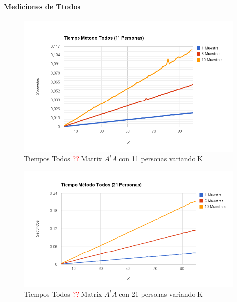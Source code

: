 \paragraph{Mediciones de Ttodos }

\begin{figure}[H]
\includegraphics[width=1\textwidth]{img/imaged.png}
     \caption{Tiempos Todos \textcolor{red}{??} Matrix $A^tA$ con 11 personas variando K}
     \label{fig:figura1}
\end{figure}

\begin{figure}[H]
\includegraphics[width=1\textwidth]{img/imagee.png}
     \caption{Tiempos Todos \textcolor{red}{??} Matrix $A^tA$ con 21 personas variando K}
     \label{fig:figura1}
\end{figure}

